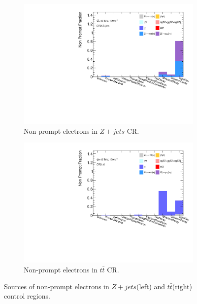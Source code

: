 \begin{figure}[!htbp]
    \begin{subfigure}{.49\textwidth}
      \centering
      \includegraphics[width=.9\linewidth]{figures/Analysis/Background/NonPromptComposition_ZplusX_Electrons.pdf}  
      \caption{Non-prompt electrons in $Z+jets$ CR.}
    \end{subfigure}
    \begin{subfigure}{.49\textwidth}
      \centering
      \includegraphics[width=.9\linewidth]{figures/Analysis/Background/NonPromptComposition_ttbar_Electrons.pdf}
      \caption{Non-prompt electrons in $t\bar{t}$ CR.}
    \end{subfigure}
    \caption{Sources of non-prompt electrons in $Z+jets$(left) and $t\bar{t}$(right) control regions. \label{fig:FakeCompositionCR2LElectron}}
    \end{figure}

